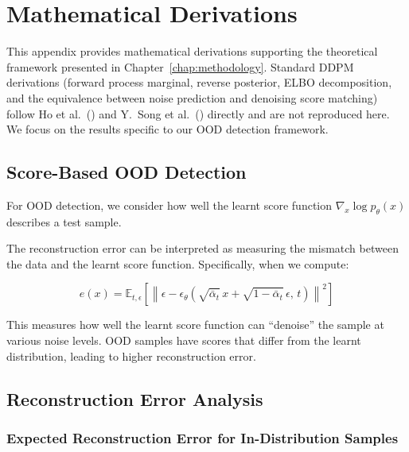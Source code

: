 \begingroup
\fontsize{11pt}{13.2pt}\selectfont
\chapter{Mathematical Derivations}
\label{app:math-derivations}

This appendix provides mathematical derivations supporting the theoretical framework presented in Chapter~\ref{chap:methodology}. Standard DDPM derivations (forward process marginal, reverse posterior, ELBO decomposition, and the equivalence between noise prediction and denoising score matching) follow Ho et al.~(\citeyear{ho2020denoising}) and Y.~Song et al.~(\citeyear{song2021score}) directly and are not reproduced here. We focus on the results specific to our OOD detection framework.

\section{Score-Based OOD Detection}
\label{app:math-derivations:score-based}

For OOD detection, we consider how well the learnt score function $\nabla_x \log p_\theta(x)$ describes a test sample.

The reconstruction error can be interpreted as measuring the mismatch between the data and the learnt score function. Specifically, when we compute:

\begin{equation}
\label{eq:appB:score-e}
e(x) = \mathbb{E}_{t,\epsilon} \left[ \left\| \epsilon - \epsilon_\theta\!\left( \sqrt{\bar{\alpha}_t}\, x + \sqrt{1 - \bar{\alpha}_t}\, \epsilon,\, t \right) \right\|^2 \right]
\end{equation}

This measures how well the learnt score function can ``denoise'' the sample at various noise levels. OOD samples have scores that differ from the learnt distribution, leading to higher reconstruction error.


\section{Reconstruction Error Analysis}
\label{app:math-derivations:reconstruction}

\subsection{Expected Reconstruction Error for In-Distribution Samples}
\label{app:math-derivations:reconstruction:id}

